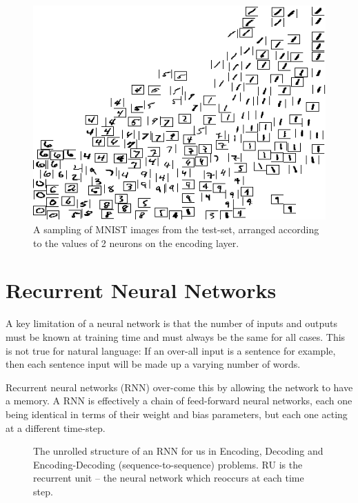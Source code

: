 \documentclass[12pt,parskip]{komatufte}
\begin{document}
\begin{figure}
	\caption{A sampling of MNIST images from the test-set, arranged according to the values of 2 neurons on the encoding layer.}
	\includegraphics[width=\textwidth]{figs/chapterintromachinelearning/mnist-encoding.png}
\end{figure}

\section{Recurrent Neural Networks}
A key limitation of a neural network is that the number of inputs and outputs must be known at training time and must always be the same for all cases.
This is not true for natural language: If an over-all input is a sentence for example, then each sentence input will be made up a varying number of words.

Recurrent neural networks (RNN) over-come this by allowing the network to have a memory.
A RNN is effectively a chain of feed-forward neural networks,
each one being identical in terms of their weight and bias parameters,
but each one acting at a different time-step.





\begin{figure}
	\caption{The unrolled structure of an RNN for us in Encoding, Decoding and Encoding-Decoding (sequence-to-sequence) problems. RU is the recurrent unit -- the neural network which reoccurs at each time step.}
	
	\label{fig-rnns}
	
	\resizebox{\textwidth}{!}{}
\end{figure}
\end{document}
